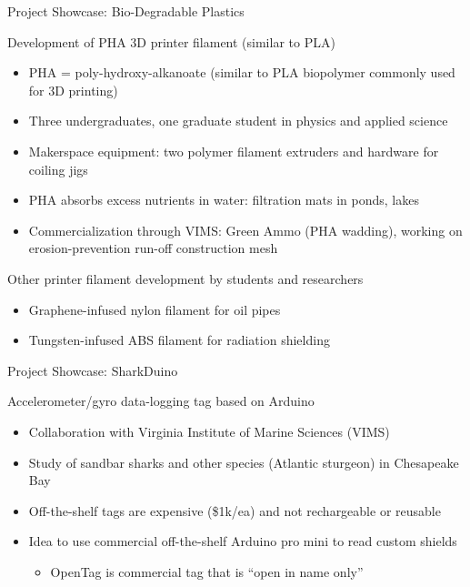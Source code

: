 \documentclass[xcolor={dvipsnames},professionalfonts]{beamer}
\begin{document}
\begin{frame}{Project Showcase: Bio-Degradable Plastics}
 \begin{block}{Development of PHA 3D printer filament (similar to PLA)}
  \begin{itemize}
   \item PHA = poly-hydroxy-alkanoate (similar to PLA biopolymer commonly used for 3D printing)
   \item Three undergraduates, one graduate student in physics and applied science
   \item Makerspace equipment: two polymer filament extruders and hardware for coiling jigs
   \item PHA absorbs excess nutrients in water: filtration mats in ponds, lakes
   \item Commercialization through VIMS: Green Ammo (PHA wadding), working on erosion-prevention run-off construction mesh
  \end{itemize}
 \end{block}
 \begin{block}{Other printer filament development by students and researchers}
  \begin{itemize}
   \item Graphene-infused nylon filament for oil pipes
   \item Tungsten-infused ABS filament for radiation shielding
  \end{itemize}
 \end{block}
\end{frame}

\begin{frame}{Project Showcase: SharkDuino}
 \begin{block}{Accelerometer/gyro data-logging tag based on Arduino}
  \begin{itemize}
   \item Collaboration with Virginia Institute of Marine Sciences (VIMS)
   \item Study of sandbar sharks and other species (Atlantic sturgeon) in Chesapeake Bay
   \item Off-the-shelf tags are expensive (\$1k/ea) and not rechargeable or reusable
   \item Idea to use commercial off-the-shelf Arduino pro mini to read custom shields
    \begin{itemize}
     \item OpenTag is commercial tag that is ``open in name only''
    \end{itemize}
  \end{itemize}
 \end{block}
\end{frame}
\end{document}
